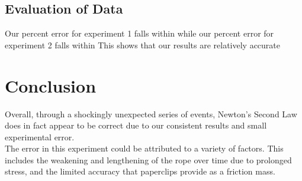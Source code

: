 \documentclass[12pt]{article}
\begin{document}
        \subsection{Evaluation of Data}
           Our percent error for experiment 1 falls within %
           while our percent error for experiment 2 falls within %
           This shows that our results are relatively accurate
    \section{Conclusion}
        Overall, through a shockingly unexpected series of events,
        Newton's Second Law does in fact appear to be correct due to
        our consistent results and small experimental error. \\
        The error in this experiment could be attributed to a variety of
        factors. This includes the weakening and lengthening of the rope 
        over time due to prolonged stress, and the limited accuracy
        that paperclips provide as a friction mass.
        
\end{document}
